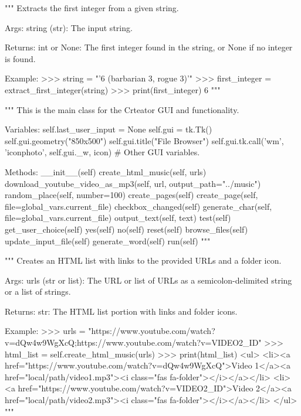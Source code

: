 \begin{codebox}
"""
Extracts the first integer from a given string.

Args:
    string (str): The input string.

Returns:
    int or None: The first integer found in the string, or None if no integer is found.

Example:
    >>> string = "'6 (barbarian 3, rogue 3)'"
    >>> first_integer = extract_first_integer(string)
    >>> print(first_integer)
    6
"""
\end{codebox}

\begin{classbox}
"""
This is the main class for the Crteator GUI and functionality.

Variables:
	self.last_user_input = None
	self.gui = tk.Tk()
	self.gui.geometry("850x500")
	self.gui.title("File Browser")
	self.gui.tk.call('wm', 'iconphoto', self.gui._w, icon)
	# Other GUI variables.
	
Methods:
	__init__(self)
	create_html_music(self, urls)
	download_youtube_video_as_mp3(self, url, output_path="../music")
	random_place(self, number=100)
	create_pages(self)
	create_page(self, file=global_vars.current_file)
	checkbox_changed(self)
	generate_char(self, file=global_vars.current_file)
	output_text(self, text)
	test(self)
	get_user_choice(self)
	yes(self)
	no(self)
	reset(self)
	browse_files(self)
	update_input_file(self)
	generate_word(self)
	run(self)
"""
\end{classbox}

\begin{codebox}
"""
Creates an HTML list with links to the provided URLs and a folder icon.

Args:
    urls (str or list): The URL or list of URLs as a semicolon-delimited string or a list of strings.

Returns:
    str: The HTML list portion with links and folder icons.

Example:
    >>> urls = "https://www.youtube.com/watch?v=dQw4w9WgXcQ;https://www.youtube.com/watch?v=VIDEO2_ID"
    >>> html_list = self.create_html_music(urls)
    >>> print(html_list)
    <ul>
    <li><a href="https://www.youtube.com/watch?v=dQw4w9WgXcQ">Video 1</a><a href="local/path/video1.mp3"><i class="fas fa-folder"></i></a></li>
    <li><a href="https://www.youtube.com/watch?v=VIDEO2_ID">Video 2</a><a href="local/path/video2.mp3"><i class="fas fa-folder"></i></a></li>
    </ul>
"""
\end{codebox}


